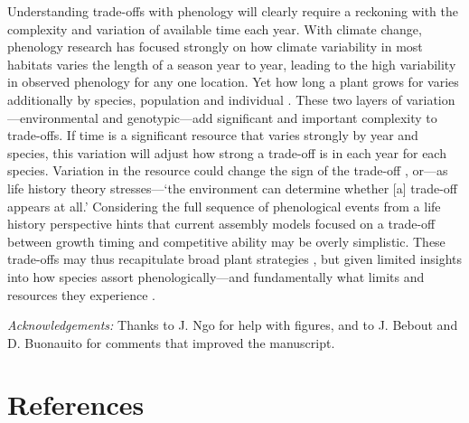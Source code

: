 \documentclass[11pt]{article}
\begin{document}
Understanding trade-offs with phenology will clearly require a reckoning with the complexity and variation of available time each year. With climate change, phenology research has focused strongly on how climate variability in most habitats varies the length of a season year to year, leading to the high variability in observed phenology for any one location. Yet how long a plant grows for varies additionally by species, population and individual \citep{ettinger2018phenological,korner2023four}. These two layers of variation---environmental and genotypic---add significant and important complexity to trade-offs. If time is a significant resource that varies strongly by year and species, this variation will adjust how strong a trade-off is in each year for each species. Variation in the resource could change the sign of the trade-off \citep{van1986acquisition}, or---as life history theory stresses---`the environment can determine whether [a] trade-off appears at all.' Considering the full sequence of phenological events from a life history perspective hints that current assembly models focused on a trade-off between growth timing and competitive ability may be overly simplistic. These trade-offs may thus recapitulate broad plant strategies \citep{grime1977evidence}, but given limited insights into how species assort phenologically---and fundamentally what limits and resources they experience \citep{stanton2000}. 

\emph{Acknowledgements:} Thanks to J. Ngo for help with figures, and to J. Bebout and D. Buonauito for comments that improved the manuscript.

\newpage
\section{References}


\newpage
\end{document}
